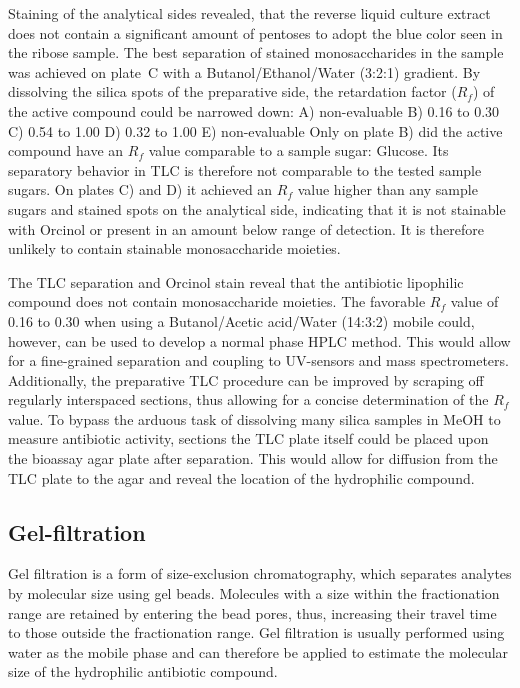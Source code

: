 Staining of the analytical sides revealed, that the reverse liquid culture extract does not contain a significant amount of pentoses to adopt the blue color seen in the ribose sample.
The best separation of stained monosaccharides in the sample was achieved on plate~C with a Butanol/Ethanol/Water (3:2:1) gradient.
By dissolving the silica spots of the preparative side, the retardation factor ($R_f$) of the active compound could be narrowed down:
	 A) non-evaluable
	 B) 0.16 to 0.30
	 C) 0.54 to 1.00
	 D) 0.32 to 1.00
	 E) non-evaluable
Only on plate B) did the active compound have an $R_f$ value comparable to a sample sugar: Glucose.
Its separatory behavior in TLC is therefore not comparable to the tested sample sugars.
On plates C) and D) it achieved an $R_f$ value higher than any sample sugars and stained spots on the analytical side, indicating that it is not stainable with Orcinol or present in an amount below range of detection.
It is therefore unlikely to contain stainable monosaccharide moieties.

The TLC separation and Orcinol stain reveal that the antibiotic lipophilic compound does not contain monosaccharide moieties.
The favorable $R_f$ value of 0.16 to 0.30 when using a Butanol/Acetic acid/Water (14:3:2) mobile could, however, can be used to develop a normal phase HPLC method.
This would allow for a fine-grained separation and coupling to UV-sensors and mass spectrometers.
Additionally, the preparative TLC procedure can be improved by scraping off regularly interspaced sections, thus allowing for a concise determination of the $R_f$ value.
To bypass the arduous task of dissolving many silica samples in MeOH to measure antibiotic activity, sections the TLC plate itself could be placed upon the bioassay agar plate after separation.
This would allow for diffusion from the TLC plate to the agar and reveal the location of the hydrophilic compound.


\subsection{Gel-filtration} %
\label{sub:results_gel_filtration}

Gel filtration is a form of size-exclusion chromatography, which separates analytes by molecular size using gel beads.\autocite{Andrews1965,Laurent1964}
Molecules with a size within the fractionation range are retained by entering the bead pores, thus, increasing their travel time to those outside the fractionation range.
Gel filtration is usually performed using water as the mobile phase and can therefore be applied to estimate the molecular size of the hydrophilic antibiotic compound.

